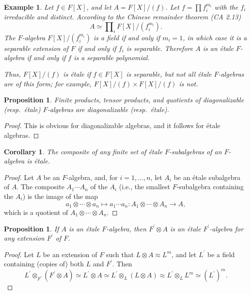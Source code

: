 \documentclass[a4paper,11pt,final,openany]{memoir}
\newtheorem{corollary}[X]{Corollary}
\newtheorem{proposition}[X]{Proposition}
\newtheorem{example}[X]{Example}
\theoremstyle{nonumberplain}
\newtheorem{proof}{Proof.}
\begin{document}
\begin{example}
\label{ag41}Let $f\in F[X]$, and let $A=F[X]/(f)$. Let $f=\prod f_{i}^{m_{i}}$
with the $f_{i}$ irreducible and distinct. According to the Chinese remainder
theorem (CA 2.13)%
\[
A\simeq\prod\nolimits_{i}F[X]/(f_{i}^{m_{i}}).
\]
The $F$-algebra $F[X]/(f_{i}^{m_{i}})$ is a field if and only if $m_{i}=1$, in
which case it is a separable extension of $F$ if and only if $f_{i}$ is
separable. Therefore $A$ is an \'{e}tale $F$-algebra if and only if $f$ is a
separable polynomial.

Thus, $F[X]/(f)$ is \'{e}tale if $f\in F[X]$ is separable, but not all
\'{e}tale $F$-algebras are of this form; for example, $F[X]/(f)\times
F[X]/(f)$ is not.
\end{example}

\begin{proposition}
\label{B68}Finite products, tensor products, and quotients of diagonalizable
(resp.\ \'{e}tale) $F$-algebras are diagonalizable (resp.\ \'{e}tale).
\end{proposition}

\begin{proof}
This is obvious for diagonalizable algebras, and it follows for \'{e}tale algebras.
\end{proof}

\begin{corollary}
\label{B69}The composite of any finite set of \'{e}tale $F$-subalgebras of an
$F$-algebra is \'{e}tale.
\end{corollary}

\begin{proof}
Let $A$ be an $F$-algebra, and, for $i=1,\ldots,n$, let $A_{i}$ be an
\'{e}tale subalgebra of $A$. The composite $A_{1}\cdots A_{n}$ of the $A_{i}$
(i.e., the smallest $F$-subalgebra containing the $A_{i}$) is the image of the
map
\[
a_{1}\otimes\cdots\otimes a_{n}\mapsto a_{1}\cdots a_{n}\colon A_{1}%
\otimes\cdots\otimes A_{n}\rightarrow A,
\]
which is a quotient of $A_{1}\otimes\cdots\otimes A_{n}$.
\end{proof}

\begin{proposition}
\label{B70}If $A$ is an \'{e}tale $F$-algebra, then $F^{\prime}\otimes A$ is
an \'{e}tale $F^{\prime}$-algebra for any extension $F^{\prime}$ of $F$.
\end{proposition}

\begin{proof}
Let $L$ be an extension of $F$ such that $L\otimes A\approx L^{m}$, and let
$L^{\prime}$ be a field containing (copies of) both $L$ and $F^{\prime}$.
Then
\[
L^{\prime}\otimes_{F^{\prime}}\left(  F^{\prime}\otimes A\right)  \simeq
L^{\prime}\otimes A\simeq L^{\prime}\otimes_{L}(L\otimes A)\approx L^{\prime
}\otimes_{L}L^{m}\simeq\left(  L^{\prime}\right)  ^{m}\text{.}%
\]

\end{proof}
\end{document}
